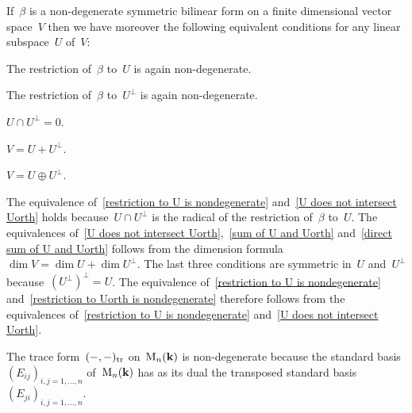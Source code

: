 \begin{recall}
  If~$\beta$ is a non-degenerate symmetric bilinear form on a finite dimensional vector space~$V$ then we have moreover the following equivalent conditions for any linear subspace~$U$ of~$V$:
  \begin{equivalenceslist}
    \item
      \label{restriction to U is nondegenerate}
      The restriction of~$\beta$ to~$U$ is again non-degenerate.
    \item
      \label{restriction to Uorth is nondegenerate}
      The restriction of~$\beta$ to~$U^\perp$ is again non-degenerate.
    \item
      \label{U does not intersect Uorth}
      $U \cap U^\perp = 0$.
    \item
      \label{sum of U and Uorth}
      $V = U + U^\perp$.
    \item
      \label{direct sum of U and Uorth}
      $V = U \oplus U^\perp$.
  \end{equivalenceslist}
  The equivalence of~\ref*{restriction to U is nondegenerate} and~\ref*{U does not intersect Uorth} holds because~$U \cap U^\perp$ is the radical of the restriction of~$\beta$ to~$U$.
  The equivalences of~\ref*{U does not intersect Uorth},~\ref*{sum of U and Uorth} and~\ref*{direct sum of U and Uorth} follows from the dimension formula~$\dim V = \dim U + \dim U^\perp$.
  The last three conditions are symmetric in~$U$ and~$U^\perp$ because~$(U^\perp)^\perp = U$.
  The equivalence of~\ref*{restriction to U is nondegenerate} and~\ref*{restriction to Uorth is nondegenerate} therefore follows from the equivalences of~\ref*{restriction to U is nondegenerate} and~\ref*{U does not intersect Uorth}.
\end{recall}


\begin{example}
  The trace form~$(-,-)_{\operatorname{tr}}$ on~$\operatorname{M}_n(\mathbf{k})$ is non-degenerate because the standard basis~$(E_{ij})_{i,j = 1, \dotsc, n}$ of~$\operatorname{M}_n(\mathbf{k})$ has as its dual the transposed standard basis~$(E_{ji})_{i,j = 1, \dotsc, n}$.
\end{example}


